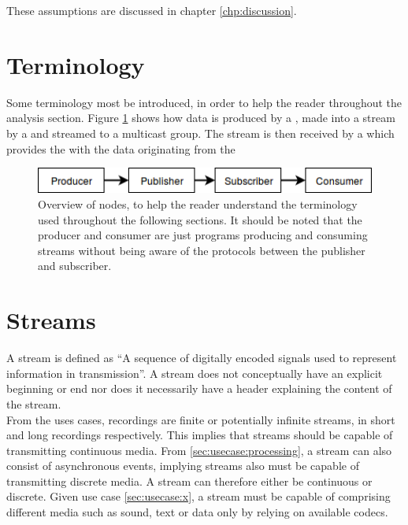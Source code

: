 These assumptions are discussed in chapter \ref{chp:discussion}. 

\section{Terminology} \label{sec:analysis:terminology}
Some terminology most be introduced, in order to help the reader throughout the analysis section. Figure \ref{fig:analysis:terminology} shows how data is produced by a , made into a stream by a  and streamed to a multicast group. The stream is then received by a  which provides the  with the data  originating from the 

\begin{figure}[h!]
	\includegraphics[width=1\textwidth]{figures/analysis-terminilogy-overview.png}
	\caption{Overview of nodes, to help the reader understand the terminology used throughout the following sections. It should be noted that the producer and consumer are just programs producing and consuming streams without being aware of the protocols between the publisher and subscriber.} \label{fig:analysis:terminology}
\end{figure} 




\section{Streams} \label{sec:analysis:streams}
A stream is defined as ``A sequence of digitally encoded signals used to represent information in transmission''\citep{data_stream_2018}. A stream does not conceptually have an explicit beginning or end nor does it necessarily have a header explaining the content of the stream.\\
From the uses cases, recordings are finite or potentially infinite streams, in short and long recordings respectively. This implies that streams should be capable of transmitting   continuous media. From \ref{sec:usecase:processing}, a stream can also consist of asynchronous events, implying streams also must be capable of transmitting discrete media. 
A stream can therefore either be continuous or discrete. 
Given use case \ref{sec:usecase:x}, a stream must be capable of comprising  different media such as sound, text or data only by relying on available codecs. 

